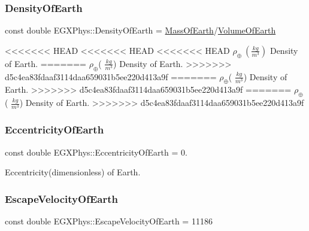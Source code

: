 \subsubsection{\texorpdfstring{Density\+Of\+Earth}{DensityOfEarth}}
{\footnotesize\ttfamily const double E\+G\+X\+Phys\+::\+Density\+Of\+Earth = \hyperlink{namespace_e_g_x_phys_ace4a9d8c0b21215536857f4c1087a4e8}{Mass\+Of\+Earth}/\hyperlink{namespace_e_g_x_phys_a73aaaddeacf5d59643ec5e4a53a1a251}{Volume\+Of\+Earth}}

<<<<<<< HEAD
<<<<<<< HEAD
<<<<<<< HEAD
$\rho_\oplus\ (\frac{kg}{m^3})$ Density of Earth. \mbox{\label{namespace_e_g_x_phys_a327bbaf59d546f8524d6fb9da919d939}} 
=======
$\rho_\oplus$( $\frac{kg}{m^3}$) Density of Earth. \mbox{\label{namespace_e_g_x_phys_a327bbaf59d546f8524d6fb9da919d939}} 
>>>>>>> d5c4ea83fdaaf3114daa659031b5ee220d413a9f
=======
$\rho_\oplus$( $\frac{kg}{m^3}$) Density of Earth. \mbox{\label{namespace_e_g_x_phys_a327bbaf59d546f8524d6fb9da919d939}} 
>>>>>>> d5c4ea83fdaaf3114daa659031b5ee220d413a9f
=======
$\rho_\oplus$( $\frac{kg}{m^3}$) Density of Earth. \mbox{\label{namespace_e_g_x_phys_a327bbaf59d546f8524d6fb9da919d939}} 
>>>>>>> d5c4ea83fdaaf3114daa659031b5ee220d413a9f
\subsubsection{\texorpdfstring{Eccentricity\+Of\+Earth}{EccentricityOfEarth}}
{\footnotesize\ttfamily const double E\+G\+X\+Phys\+::\+Eccentricity\+Of\+Earth = 0.}

Eccentricity(dimensionless) of Earth. \mbox{\label{namespace_e_g_x_phys_a6a8cb7abae15a2f1bbcfd6623f72316c}} 
\subsubsection{\texorpdfstring{Escape\+Velocity\+Of\+Earth}{EscapeVelocityOfEarth}}
{\footnotesize\ttfamily const double E\+G\+X\+Phys\+::\+Escape\+Velocity\+Of\+Earth = 11186}

